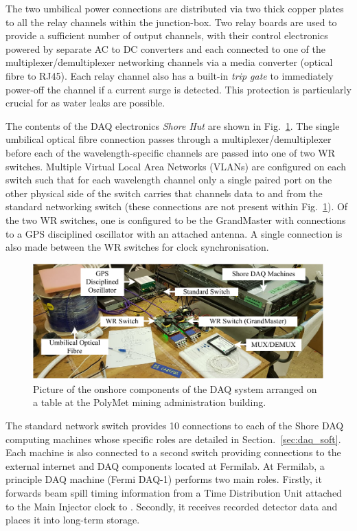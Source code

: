 The two umbilical power connections are distributed via two thick copper plates to all the relay
channels within the junction-box. Two relay boards are used to provide a sufficient number of
output channels, with their control electronics powered by separate AC to DC converters and each
connected to one of the multiplexer/demultiplexer networking channels via a media converter
(optical fibre to RJ45). Each relay channel also has a built-in \emph{trip gate} to immediately
power-off the channel if a current surge is detected. This protection is particularly crucial for
\chipsfive as water leaks are possible.

The contents of the DAQ electronics \emph{Shore Hut} are shown in Fig.~\ref{fig:hut_daq}. The
single umbilical optical fibre connection passes through a multiplexer/demultiplexer before each
of the wavelength-specific channels are passed into one of two WR switches. Multiple Virtual Local
Area Networks (VLANs) are configured on each switch such that for each wavelength channel only a
single paired port on the other physical side of the switch carries that channels data to and from
the standard networking switch (these connections are not present within Fig.~\ref{fig:hut_daq}).
Of the two WR switches, one is configured to be the GrandMaster with connections to a GPS
disciplined oscillator with an attached antenna. A single connection is also made between the WR
switches for clock synchronisation.

\begin{figure} %
    \includegraphics[width=\textwidth]{diagrams/5-daq/hut_daq.pdf}
    \caption[Picture of the onshore components of the \chipsfive DAQ system]
    {Picture of the onshore components of the \chipsfive DAQ system arranged on a table at the
        PolyMet mining administration building.}
    \label{fig:hut_daq}
\end{figure}

The standard network switch provides \unit{10}{} connections to each of the Shore DAQ
computing machines whose specific roles are detailed in Section.~\ref{sec:daq_soft}. Each machine
is also connected to a second switch providing connections to the external internet and DAQ
components located at Fermilab. At Fermilab, a principle DAQ machine (Fermi DAQ-1) performs two
main roles. Firstly, it forwards \numi beam spill timing information from a Time Distribution Unit
attached to the Main Injector clock to \chipsfive. Secondly, it receives recorded detector data
and places it into long-term storage.


